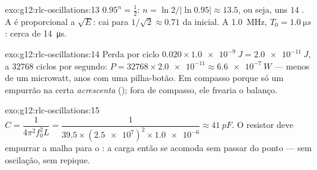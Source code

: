 \begin{solution}{exo:g12:rlc-oscillations:13}
$0.95^n = \tfrac12$: $n = \ln 2/\lvert\ln 0.95\rvert \approx 13.5$, ou
seja, uns $14$ . A  é proporcional a $\sqrt{E}$: cai
para $1/\sqrt{2} \approx 0.71$ da inicial. A \qty{1.0}{MHz},
$T_0 = \qty{1.0}{\micro s}$: cerca de \qty{14}{\micro s}.
\end{solution}

\begin{solution}{exo:g12:rlc-oscillations:14}
Perda por ciclo $0.020 \times \qty{1.0e-9}{J} = \qty{2.0e-11}{J}$, a
\num{32768} ciclos por segundo:
$P = \num{32768} \times \num{2.0e-11} \approx \qty{6.6e-7}{W}$ ---
menos de um microwatt, anos com uma pilha-botão. Em compasso porque só um
empurrão na  certa \emph{acrescenta}  (); fora de
compasso, ele frearia o balanço.
\end{solution}

\begin{solution}{exo:g12:rlc-oscillations:15}
$C = \dfrac{1}{4\pi^2 f_0^2 L} = \dfrac{1}{39.5 \times
(\num{2.5e7})^2 \times \num{1.0e-6}} \approx \qty{41}{pF}$. O resistor
deve empurrar a malha para o : a carga então se acomoda
sem passar do ponto --- sem oscilação, sem repique.
\end{solution}

